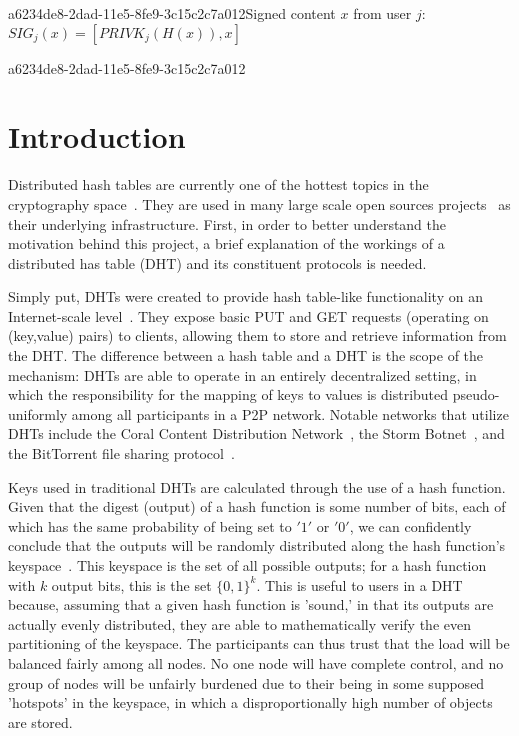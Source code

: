\documentclass[12pt]{article}
\begin{document}
a6234de8-2dad-11e5-8fe9-3c15c2c7a012Signed content $x$ from user $j$: $SIG_j(x) = \left[ PRIVK_j( H(x) ), x \right]$

a6234de8-2dad-11e5-8fe9-3c15c2c7a012\section{Introduction}
\par Distributed hash tables are currently one of the hottest topics in the cryptography space~\cite{Stoica:2001dj,Rowstron:2001ea,Ratnasamy:2001wn}. They are used in many large scale open sources projects~\cite{Freitas:2013tb,Xu:2010vs,Perfitt:2010fh} as their underlying infrastructure. First, in order to better understand the motivation behind this project, a brief explanation of the workings of a distributed has table (DHT) and its constituent protocols is needed.

\par Simply put, DHTs were created to provide hash table-like functionality on an Internet-scale level~\cite{Ratnasamy:2001wn}. They expose basic PUT and GET requests (operating on (key,value) pairs) to clients, allowing them to store and retrieve information from the DHT. The difference between a hash table and a DHT is the scope of the mechanism: DHTs are able to operate in an entirely decentralized setting, in which the responsibility for the mapping of keys to values is distributed pseudo-uniformly among all participants in a P2P network. Notable networks that utilize DHTs include the Coral Content Distribution Network~\cite{Freedman:2004vb}, the Storm Botnet~\cite{Holz:2008uk}, and the BitTorrent file sharing protocol~\cite{Cohen:y1_8mBnw}.

\par Keys used in traditional DHTs are calculated through the use of a hash function. Given that the digest (output) of a hash function is some number of bits, each of which has the same probability of being set to $'1'$ or $'0'$, we can confidently conclude that the outputs will be randomly distributed along the hash function's keyspace~. This keyspace is the set of all possible outputs; for a hash function with $k$ output bits, this is the set $\{0,1\}^k$. This is useful to users in a DHT because, assuming that a given hash function is 'sound,' in that its outputs are actually evenly distributed, they are able to mathematically verify the even partitioning of the keyspace. The participants can thus trust that the load will be balanced fairly among all nodes. No one node will have complete control, and no group of nodes will be unfairly burdened due to their being in some supposed 'hotspots' in the keyspace, in which a disproportionally high number of objects are stored.~
\end{document}
